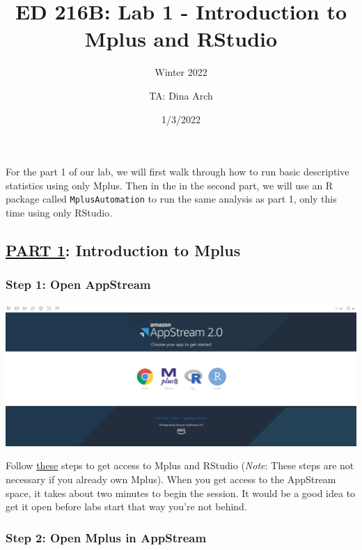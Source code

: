 \documentclass[
]{article}
\title{ED 216B: Lab 1 - Introduction to Mplus and RStudio}
\subtitle{Winter 2022}
\author{TA: Dina Arch}
\date{1/3/2022}
\begin{document}
\maketitle

{
\setcounter{tocdepth}{2}
\tableofcontents
}
For the part 1 of our lab, we will first walk through how to run basic
descriptive statistics using only Mplus. Then in the in the second part,
we will use an R package called \texttt{MplusAutomation} to run the same
analysis as part 1, only this time using only RStudio.

\hypertarget{part-1-introduction-to-mplus}{%
\subsection{\texorpdfstring{\underline{PART 1}: Introduction to
Mplus}{PART 1: Introduction to Mplus}}\label{part-1-introduction-to-mplus}}

\hypertarget{step-1-open-appstream}{%
\subsubsection{Step 1: Open AppStream}\label{step-1-open-appstream}}

\includegraphics{appstream.jpg}

Follow
\href{https://docs.google.com/document/d/1ligSL9zj7lZIK6VDhF1dLScArrufTd6vLFgcOm05M-4/edit?usp=sharing}{these}
steps to get access to Mplus and RStudio (\emph{Note}: These steps are
not necessary if you already own Mplus). When you get access to the
AppStream space, it takes about two minutes to begin the session. It
would be a good idea to get it open before labs start that way you're
not behind.

\hypertarget{step-2-open-mplus-in-appstream}{%
\subsubsection{Step 2: Open Mplus in
AppStream}\label{step-2-open-mplus-in-appstream}}
\end{document}
